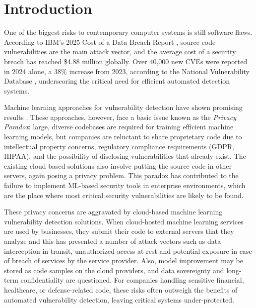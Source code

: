 \documentclass[pdflatex,sn-mathphys-num]{sn-jnl}
\theoremstyle{thmstyleone}%
\theoremstyle{thmstyletwo}%
\theoremstyle{thmstylethree}%
\begin{document}

\section{Introduction}\label{sec:intro}

One of the biggest risks to contemporary computer systems is still software flaws. According to IBM's 2025 Cost of a Data Breach Report \cite{ibm2024}, source code vulnerabilities are the main attack vector, and the average cost of a security breach has reached \$4.88 million globally. Over 40,000 new CVEs were reported in 2024 alone, a 38\% increase from 2023, according to the National Vulnerability Database \cite{nist2024}, underscoring the critical need for efficient automated detection systems.

Machine learning approaches for vulnerability detection have shown promising results \cite{zhou2019devign, li2018vuldeepecker, fu2022linevul}. These approaches, however, face a basic issue known as the \textit{Privacy Paradox}: large, diverse codebases are required for training efficient machine learning models, but companies are reluctant to share proprietary code due to intellectual property concerns, regulatory compliance requirements (GDPR, HIPAA), and the possibility of disclosing vulnerabilities that already exist. The existing cloud based solutions also involve putting the source code in other servers, again posing a privacy problem. This paradox has contributed to the failure to implement ML-based security tools in enterprise environments, which are the place where most critical security vulnerabilities are likely to be found.

These privacy concerns are aggravated by cloud-based machine learning vulnerability detection solutions. When cloud-hosted machine learning services are used by businesses, they submit their code to external servers that they analyze and this has presented a number of attack vectors such as data interception in transit, unauthorized access at rest and potential exposure in case of breach of services by the service provider. Also, model improvement may be stored as code samples on the cloud providers, and data sovereignty and long-term confidentiality are questioned. For companies handling sensitive financial, healthcare, or defense-related code, these risks often outweigh the benefits of automated vulnerability detection, leaving critical systems under-protected.
\end{document}
